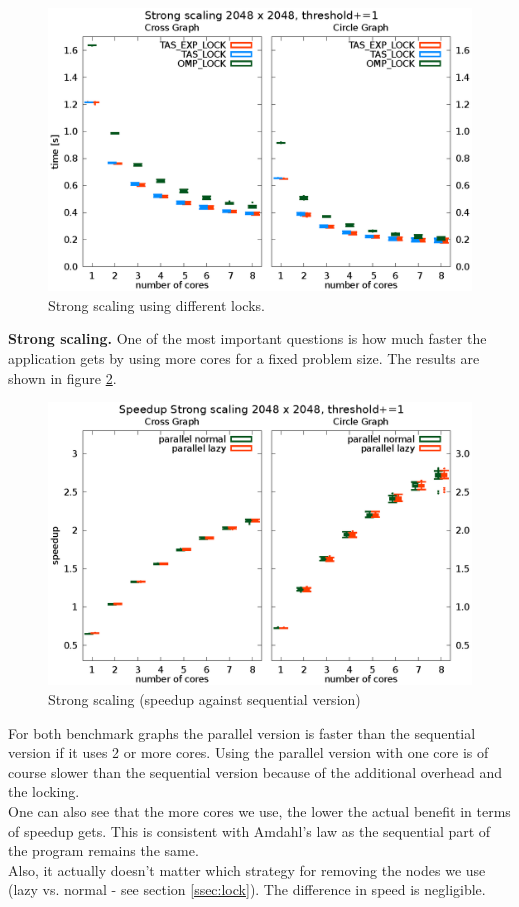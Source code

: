 \documentclass[letterpaper]{article}
\newcommand{\mypar}[1]{{\bf #1.}}
\begin{document}
\begin{figure}[h]\centering
  \includegraphics[scale=0.558]{lock_benchmark.eps}
  \caption{Strong scaling using different locks.\label{fig:lock_bench}}
\end{figure}


\mypar{Strong scaling}
One of the most important questions is how much faster the application gets by using more cores for a fixed problem size. The results are shown in figure \ref{fig:strong_scaling}.
\begin{figure}[h]\centering
  \includegraphics[scale=0.558]{strong_scaling_speedup.eps}
  \caption{Strong scaling (speedup against sequential version) \label{fig:strong_scaling}}
\end{figure}
For both benchmark graphs the parallel version is faster than the sequential version if it uses 2 or more cores. Using the parallel version with one core is of course slower than the sequential version  because of the additional overhead and the locking.\\
One can also see that the more cores we use, the lower the actual benefit in terms of speedup gets. This is consistent with Amdahl's law as the sequential part of the program remains the same.\\
Also, it actually doesn't matter which strategy for removing the nodes we use (lazy vs. normal - see section \ref{ssec:lock}). The difference in speed is negligible.
\end{document}
